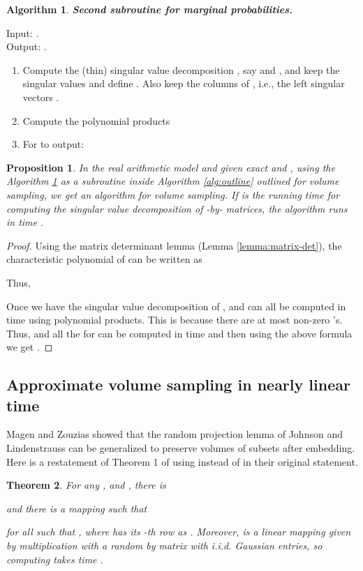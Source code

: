 \documentclass[11pt]{article}
\newtheorem{theorem}{Theorem}
\newtheorem{prop}[theorem]{Proposition}
\newtheorem{alg}{Algorithm}
\begin{document}
\begin{framed}
\begin{alg}\label{alg:svdSub}
{\bf Second subroutine for marginal probabilities.}
\end{alg}
\noindent Input: . \\
\noindent Output: .

\begin{enumerate}
\item Compute the (thin) singular value decomposition , say  and , and keep the singular values  and define . Also keep the columns of , i.e., the left singular vectors .
\item Compute the polynomial products

\item For  to  output:

\end{enumerate}
\end{framed}
\begin{prop} \label{prop:svdVS}
In the real arithmetic model and given exact  and , using the Algorithm \ref{alg:svdSub} as a subroutine inside Algorithm \ref{alg:outline} outlined for volume sampling, we get an algorithm for volume sampling. If  is the running time for computing the singular value decomposition of -by- matrices, the algorithm runs in time .
\end{prop}

\begin{proof}
Using the matrix determinant lemma (Lemma \ref{lemma:matrix-det}), the characteristic polynomial of  can be written as

Thus,

Once we have the singular value decomposition of ,  and  can all be computed in time  using polynomial products. This is because there are at most  non-zero 's. Thus,  and all the  for  can be computed in time  and then using the above formula we get .
\end{proof}

\subsection{Approximate volume sampling in nearly linear time}\label{subsec:random-proj}
Magen and Zouzias \cite{MZ} showed that the random projection lemma of Johnson and Lindenstrauss can be generalized to preserve volumes of subsets after embedding. Here is a restatement of Theorem 1 of \cite{MZ} using  instead of  in their original statement.
\begin{theorem} \label{thm:random-projection} \cite{MZ}
For any ,  and , there is

and there is a mapping  such that

for all  such that , where  has its -th row as . Moreover,  is a linear mapping given by multiplication with a random  by  matrix with i.i.d. Gaussian entries, so computing  takes time .
\end{theorem}
\end{document}
